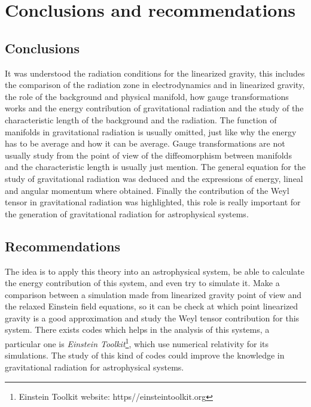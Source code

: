 \chapter{Conclusions and recommendations}
\section{Conclusions}
It was understood the radiation conditions for the linearized gravity, this includes the comparison of the radiation zone in electrodynamics and in linearized gravity, the role of the background and physical manifold, how gauge transformations works and the energy contribution of gravitational radiation and the study of the characteristic length of the background and the radiation. The function of manifolds in gravitational radiation is usually omitted, just like why the energy has to be average and how it can be average. Gauge transformations are not usually study from the point of view of the diffeomorphism between manifolds and the characteristic length is usually just mention. The general equation for the study of gravitational radiation was deduced and the expressions of energy, lineal and angular momentum where obtained. Finally the contribution of the Weyl tensor in gravitational radiation was highlighted, this role is really important for the generation of gravitational radiation for astrophysical systems.
\section{Recommendations}
The idea is to apply this theory into an astrophysical system, be able to calculate the energy contribution of this system, and even try to simulate it. Make a comparison between a simulation made from linearized gravity point of view and the relaxed Einstein field equations, so it can be check at which point linearized gravity is a good approximation and study the Weyl tensor contribution for this system. There exists codes which helps in the analysis of this systems, a particular one is \textit{Einstein Toolkit}\footnote{Einstein Toolkit website: https//einsteintoolkit.org}, which use numerical relativity for its simulations. The study of this kind of codes could improve the knowledge in gravitational radiation for astrophysical systems.\\
